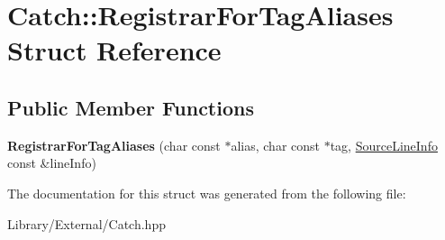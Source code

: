 \hypertarget{struct_catch_1_1_registrar_for_tag_aliases}{}\section{Catch\+:\+:Registrar\+For\+Tag\+Aliases Struct Reference}
\label{struct_catch_1_1_registrar_for_tag_aliases}
\subsection*{Public Member Functions}
\begin{DoxyCompactItemize}
\item 
\hypertarget{struct_catch_1_1_registrar_for_tag_aliases_ae4e45830e4763bcd65d55d8db9167b69}{}{\bfseries Registrar\+For\+Tag\+Aliases} (char const $\ast$alias, char const $\ast$tag, \hyperlink{struct_catch_1_1_source_line_info}{Source\+Line\+Info} const \&line\+Info)\label{struct_catch_1_1_registrar_for_tag_aliases_ae4e45830e4763bcd65d55d8db9167b69}

\end{DoxyCompactItemize}


The documentation for this struct was generated from the following file\+:\begin{DoxyCompactItemize}
\item 
Library/\+External/Catch.\+hpp\end{DoxyCompactItemize}
